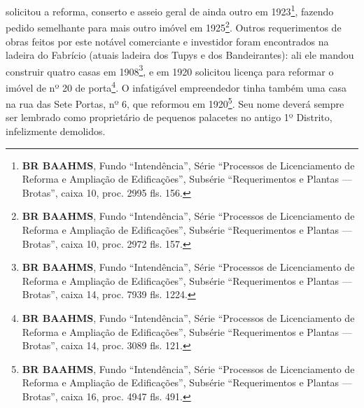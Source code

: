 solicitou a reforma, conserto e asseio geral de ainda outro em 1923\footnote{\textbf{BR BAAHMS}, Fundo ``Intendência'', Série ``Processos de Licenciamento de Reforma e Ampliação de Edificações'', Subsérie ``Requerimentos e Plantas --- Brotas'', caixa 10, proc. 2995 fls. 156.}, fazendo pedido semelhante para mais outro imóvel em 1925\footnote{\textbf{BR BAAHMS}, Fundo ``Intendência'', Série ``Processos de Licenciamento de Reforma e Ampliação de Edificações'', Subsérie ``Requerimentos e Plantas --- Brotas'', caixa 10, proc. 2972 fls. 157.}. Outros requerimentos de obras feitos por este notável comerciante e investidor foram encontrados na ladeira do Fabrício (atuais ladeira dos Tupys e dos Bandeirantes): ali ele mandou construir quatro casas em 1908\footnote{\textbf{BR BAAHMS}, Fundo ``Intendência'', Série ``Processos de Licenciamento de Reforma e Ampliação de Edificações'', Subsérie ``Requerimentos e Plantas --- Brotas'', caixa 14, proc. 7939 fls. 1224.}, e em 1920 solicitou licença para reformar o imóvel de nº 20 de porta\footnote{\textbf{BR BAAHMS}, Fundo ``Intendência'', Série ``Processos de Licenciamento de Reforma e Ampliação de Edificações'', Subsérie ``Requerimentos e Plantas --- Brotas'', caixa 14, proc. 3089 fls. 121.}. O infatigável empreendedor tinha também uma casa na rua das Sete Portas, nº 6, que reformou em 1920\footnote{\textbf{BR BAAHMS}, Fundo ``Intendência'', Série ``Processos de Licenciamento de Reforma e Ampliação de Edificações'', Subsérie ``Requerimentos e Plantas --- Brotas'', caixa 16, proc. 4947 fls. 491.}. Seu nome deverá sempre ser lembrado como proprietário de pequenos palacetes no antigo 1º Distrito, infelizmente demolidos.

